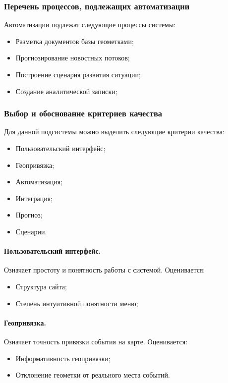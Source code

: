 \subsubsection{Перечень процессов, подлежащих автоматизации}
Автоматизации подлежат следующие процессы системы:
\begin{itemize}
\item Разметка документов базы геометками;
\item Прогнозирование новостных потоков;
\item Построение сценария развития ситуации;
\item Создание аналитической записки;
\end{itemize}

\subsubsection{Выбор и обоснование критериев качества}

Для данной подсистемы можно выделить следующие критерии качества:
\begin{itemize}
\item Пользовательский интерфейс;
\item Геопривязка;
\item Автоматизация;
\item Интеграция;
\item Прогноз;
\item Сценарии.
\end{itemize}

\paragraph{Пользовательский интерфейс.}
Означает простоту и понятность работы с системой. Оценивается:
\begin{itemize}
\item Структура сайта;
\item Степень интуитивной понятности меню;
\end{itemize}

\paragraph{Геопривязка.}
Означает точность привязки события на карте. Оценивается:
\begin{itemize}
\item Информативность геопривязки;
\item Отклонение геометки от реального места событий.
\end{itemize}

